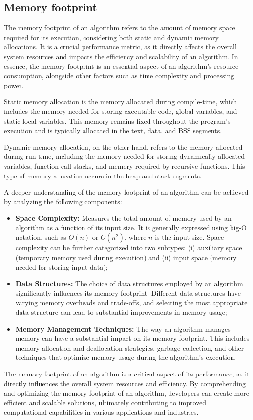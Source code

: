 \subsection{Memory footprint}
\label{subsec:memory-footprint}

The memory footprint of an algorithm refers to the amount of memory space required for its execution, considering both static and dynamic memory allocations.
It is a crucial performance metric, as it directly affects the overall system resources and impacts the efficiency and scalability of an algorithm.
In essence, the memory footprint is an essential aspect of an algorithm's resource consumption, alongside other factors such as time complexity and processing power.

Static memory allocation is the memory allocated during compile-time, which includes the memory needed for storing executable code, global variables, and static local variables.
This memory remains fixed throughout the program's execution and is typically allocated in the text, data, and \ac{BSS} segments.

Dynamic memory allocation, on the other hand, refers to the memory allocated during run-time, including the memory needed for storing dynamically allocated variables, function call stacks, and memory required by recursive functions.
This type of memory allocation occurs in the heap and stack segments.

A deeper understanding of the memory footprint of an algorithm can be achieved by analyzing the following components:

\begin{itemize}
    \item \textbf{Space Complexity:} Measures the total amount of memory used by an algorithm as a function of its input size.
        It is generally expressed using big-O notation, such as $O(n)$ or $O(n^2)$, where $n$ is the input size.
        Space complexity can be further categorized into two subtypes:
        (i) auxiliary space (temporary memory used during execution) and
        (ii) input space (memory needed for storing input data);
    \item \textbf{Data Structures:} The choice of data structures employed by an algorithm significantly influences its memory footprint.
        Different data structures have varying memory overheads and trade-offs, and selecting the most appropriate data structure can lead to substantial improvements in memory usage;
    \item \textbf{Memory Management Techniques:} The way an algorithm manages memory can have a substantial impact on its memory footprint.
        This includes memory allocation and deallocation strategies, garbage collection, and other techniques that optimize memory usage during the algorithm's execution.
\end{itemize}

The memory footprint of an algorithm is a critical aspect of its performance, as it directly influences the overall system resources and efficiency.
By comprehending and optimizing the memory footprint of an algorithm, developers can create more efficient and scalable solutions, ultimately contributing to improved computational capabilities in various applications and industries.

